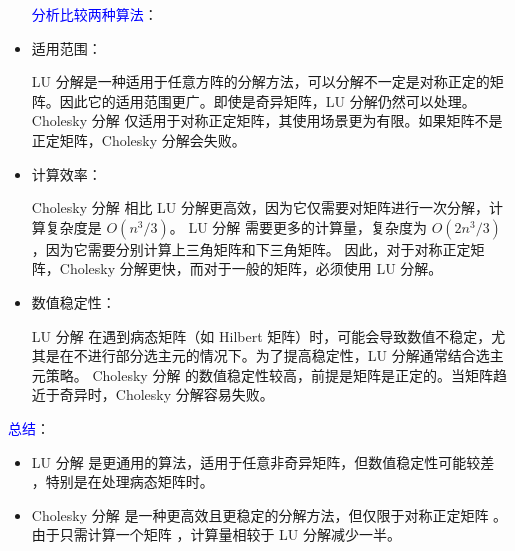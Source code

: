 \documentclass[12pt]{article}
\begin{document}
\begin{itemize}
\hfill\break

\textcolor{blue}{分析比较两种算法}：
\item 适用范围：

LU 分解是一种适用于任意方阵的分解方法，可以分解不一定是对称正定的矩阵。因此它的适用范围更广。即使是奇异矩阵，LU 分解仍然可以处理。
Cholesky 分解 仅适用于对称正定矩阵，其使用场景更为有限。如果矩阵不是正定矩阵，Cholesky 分解会失败。

\item 计算效率：

Cholesky 分解 相比 LU 分解更高效，因为它仅需要对矩阵进行一次分解，计算复杂度是 
$𝑂(𝑛^3/3)$。
LU 分解 需要更多的计算量，复杂度为 
$𝑂(2𝑛^3/3)$，因为它需要分别计算上三角矩阵和下三角矩阵。
因此，对于对称正定矩阵，Cholesky 分解更快，而对于一般的矩阵，必须使用 LU 分解。

\item 数值稳定性：

LU 分解 在遇到病态矩阵（如 Hilbert 矩阵）时，可能会导致数值不稳定，尤其是在不进行部分选主元的情况下。为了提高稳定性，LU 分解通常结合选主元策略。
Cholesky 分解 的数值稳定性较高，前提是矩阵是正定的。当矩阵趋近于奇异时，Cholesky 分解容易失败。

\end{itemize}

\textcolor{blue}{总结}：
\begin{itemize}
\item LU 分解 是更通用的算法，适用于任意非奇异矩阵，但数值稳定性可能较差
，特别是在处理病态矩阵时。
\item Cholesky 分解 是一种更高效且更稳定的分解方法，但仅限于对称正定矩阵
。由于只需计算一个矩阵
，计算量相较于 LU 分解减少一半。

\end{itemize}
\end{document}
